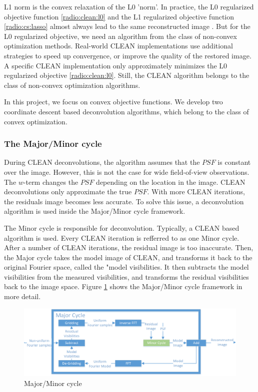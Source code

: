 L1 norm is the convex relaxation of the L0 'norm'. In practice, the L0 regularized objective function \eqref{radio:clean:l0} and the L1 regularized objective function \eqref{radio:cs:lasso} almost always lead to the same reconstructed image \cite{candes2006robust}\cite{donoho2006compressed}. But for the L0 regularized objective, we need an algorithm from the class of non-convex optimization methods. Real-world CLEAN implementations use additional strategies to speed up convergence, or improve the quality of the restored image. A specific CLEAN implementation only approximately minimizes the L0 regularized objective \eqref{radio:clean:l0}. Still, the CLEAN algorithm belongs to the class of non-convex optimization algorithms.

In this project, we focus on convex objective functions. We develop two coordinate descent based deconvolution algorithms, which belong to the class of convex optimization.


\subsubsection{The Major/Minor cycle}\label{intro2:opt:cycle}
During CLEAN deconvolutions, the algorithm assumes that the $PSF$ is constant over the image. However, this is not the case for wide field-of-view observations. The $w$-term changes the $PSF$ depending on the location in the image. CLEAN deconvolutions only approximate the true $PSF$. With more CLEAN iterations, the residuals image becomes less accurate. To solve this issue, a deconvolution algorithm is used inside the Major/Minor cycle framework. 

The Minor cycle is responsible for deconvolution. Typically, a CLEAN based algorithm is used. Every CLEAN iteration is refferred to as one Minor cycle. After a number of CLEAN iterations, the residual image is too inaccurate. Then, the Major cycle takes the model image of CLEAN, and transforms it back to the original Fourier space, called the "model visibilities. It then subtracts the model visibilities from the measured visibilities, and transforms the residual visibilities back to the image space. Figure \ref{radio:major:figure} shows the Major/Minor cycle framework in more detail.

\begin{figure}[h]
	\centering
	\includegraphics[width=0.8\linewidth]{./chapters/01.intro/Major-Minor4.png}
	\caption{Major/Minor cycle}
	\label{radio:major:figure}
\end{figure}

